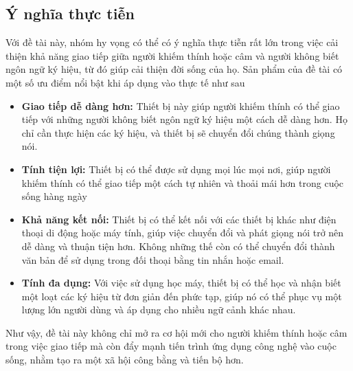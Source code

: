 \subsection{Ý nghĩa thực tiễn}
\indent Với đề tài này, nhóm hy vọng có thể  có ý nghĩa thực tiễn rất lớn trong việc cải thiện khả năng giao tiếp giữa người khiếm thính hoặc câm và người không biết ngôn ngữ ký hiệu, từ đó giúp cải thiện đời sống của họ. 
\indent Sản phẩm của đề tài có một số ưu điểm nổi bật khi áp dụng vào thực tế như sau
\begin{itemize}
    \item \textbf{Giao tiếp dễ dàng hơn:} Thiết bị này giúp người khiếm thính có thể giao tiếp với những người không biết ngôn ngữ ký hiệu một cách dễ dàng hơn. Họ chỉ cần thực hiện các ký hiệu, và thiết bị sẽ chuyển đổi chúng thành giọng nói.
    \item \textbf{Tính tiện lợi:} Thiết bị có thể được sử dụng mọi lúc mọi nơi, giúp người khiếm thính có thể giao tiếp một cách tự nhiên và thoải mái hơn trong cuộc sống hàng ngày
    \item \textbf{Khả năng kết nối:} Thiết bị có thể kết nối với các thiết bị khác như điện thoại di động hoặc máy tính, giúp việc chuyển đổi và phát giọng nói trở nên dễ dàng và thuận tiện hơn. Không những thế còn có thể chuyển đổi thành văn bản để sử dụng trong đối thoại bằng tin nhắn hoặc email.
    \item \textbf{Tính đa dụng:} Với việc sử dụng học máy, thiết bị có thể học và nhận biết một loạt các ký hiệu từ đơn giản đến phức tạp, giúp nó có thể phục vụ một lượng lớn người dùng và áp dụng cho nhiều ngữ cảnh khác nhau.
\end{itemize}

\indent Như vậy, đề tài này không chỉ mở ra cơ hội mới cho người khiếm thính hoặc câm trong việc giao tiếp mà còn đẩy mạnh tiến trình ứng dụng công nghệ vào cuộc sống, nhằm tạo ra một xã hội công bằng và tiến bộ hơn.